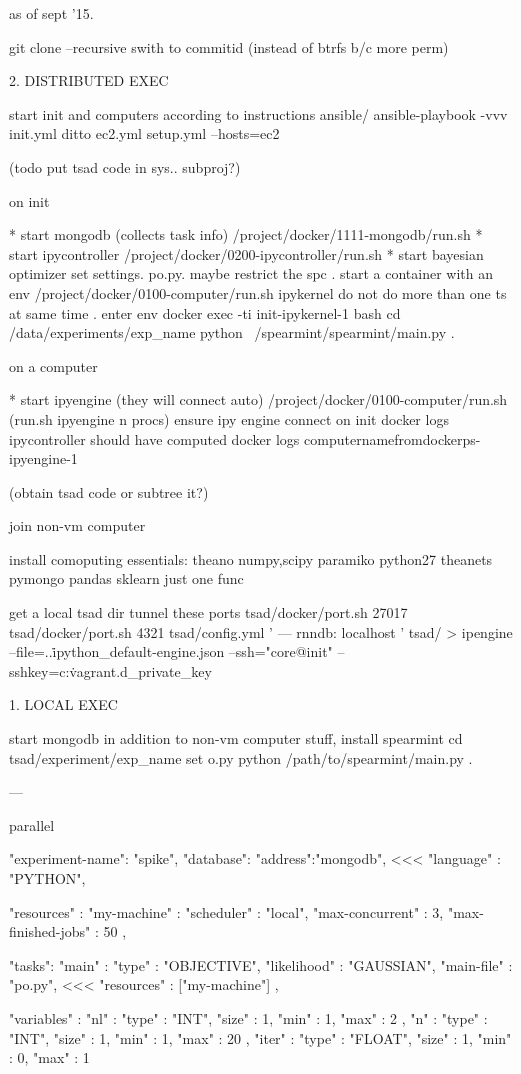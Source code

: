 as of sept '15.

git clone --recursive 
swith to commitid (instead of btrfs b/c more perm)

2. DISTRIBUTED EXEC

start init and computers according to instructions
ansible/
ansible-playbook -vvv init.yml
ditto                ec2.yml
setup.yml --hosts=ec2

(todo put tsad code in sys.. subproj?)

on init

* start mongodb (collects task info)
/project/docker/1111-mongodb/run.sh
* start ipycontroller
/project/docker/0200-ipycontroller/run.sh
* start bayesian optimizer
set settings. po.py. maybe restrict the spc
. start a container with an env
/project/docker/0100-computer/run.sh ipykernel
do not do more than one ts at same time
. enter env
docker exec -ti init-ipykernel-1 bash
cd /data/experiments/exp_name
python ~/spearmint/spearmint/main.py .


on a computer

* start ipyengine (they will connect auto)
/project/docker/0100-computer/run.sh  (run.sh ipyengine n procs)
ensure ipy engine connect on init
docker logs ipycontroller
should have computed
docker logs computernamefromdockerps-ipyengine-1

(obtain tsad code or subtree it?)


join non-vm computer

install comoputing essentials:
theano
numpy,scipy
paramiko
python27
theanets
pymongo
pandas
sklearn just one func

get a local tsad dir
tunnel these ports
tsad/docker/port.sh 27017
tsad/docker/port.sh 4321
tsad/config.yml
'
---
rnndb: localhost
'
tsad/ > ipengine --file=..\sys\files\.ipython\profile_default\security\ipcontroller-engine.json --ssh="core@init" --sshkey=c:\Users\Majid\.vagrant.d\insecure_private_key


1. LOCAL EXEC

start mongodb
in addition to non-vm computer stuff, install spearmint
cd tsad/experiment/exp_name
set o.py
python /path/to/spearmint/main.py .


---

parallel

{

    "experiment-name": "spike",
    "database": {"address":"mongodb"}, <<<
    "language"   : "PYTHON",
    
    "resources" : {
	"my-machine" : {
	    "scheduler"         : "local",
	    "max-concurrent"    : 3,
	    "max-finished-jobs" : 50
	}
    },

    "tasks": {
	"main" : {
	    "type"       : "OBJECTIVE",
	    "likelihood" : "GAUSSIAN",
	    "main-file"  : "po.py", <<<
	    "resources"  : ["my-machine"]
	}
    },
    
    "variables" : {
	"nl" : {
	    "type" : "INT",
	    "size" : 1,
	    "min"  : 1,
	    "max"  : 2
	},
	"n" : {
	    "type" : "INT",
	    "size" : 1,
	    "min"  : 1,
	    "max"  : 20
	},
	"iter" : {
	    "type" : "FLOAT",
	    "size" : 1,
	    "min"  : 0,
	    "max"  : 1
	}
    }
}


